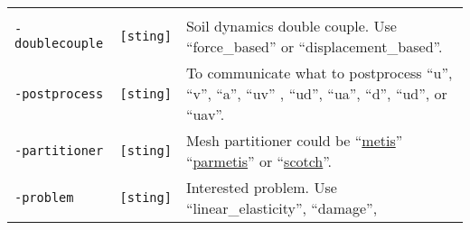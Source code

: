 \begin{longtable}[]{@{}lll@{}}
\begin{minipage}[t]{0.56\columnwidth}
\end{minipage}\tabularnewline
\begin{minipage}[t]{0.26\columnwidth}\raggedright\strut
\lstinline!-doublecouple!\strut
\end{minipage} & \begin{minipage}[t]{0.09\columnwidth}\raggedright\strut
\lstinline![sting]!\strut
\end{minipage} & \begin{minipage}[t]{0.56\columnwidth}\raggedright\strut
Soil dynamics double couple. Use ``force\_based'' or
``displacement\_based''.\strut
\end{minipage}\tabularnewline
\begin{minipage}[t]{0.26\columnwidth}\raggedright\strut
\lstinline!-postprocess!\strut
\end{minipage} & \begin{minipage}[t]{0.09\columnwidth}\raggedright\strut
\lstinline![sting]!\strut
\end{minipage} & \begin{minipage}[t]{0.56\columnwidth}\raggedright\strut
To communicate what to postprocess ``u'', ``v'', ``a'', ``uv'' , ``ud'',
``ua'', ``d'', ``ud'', or ``uav''.\strut
\end{minipage}\tabularnewline
\begin{minipage}[t]{0.26\columnwidth}\raggedright\strut
\lstinline!-partitioner!\strut
\end{minipage} & \begin{minipage}[t]{0.09\columnwidth}\raggedright\strut
\lstinline![sting]!\strut
\end{minipage} & \begin{minipage}[t]{0.56\columnwidth}\raggedright\strut
Mesh partitioner could be
``\href{http://glaros.dtc.umn.edu/gkhome/metis/metis/overview}{metis}''
``\href{http://glaros.dtc.umn.edu/gkhome/metis/parmetis/overview}{parmetis}''
or ``\href{http://www.labri.fr/perso/pelegrin/scotch/}{scotch}''.\strut
\end{minipage}\tabularnewline
\begin{minipage}[t]{0.26\columnwidth}\raggedright\strut
\lstinline!-problem!\strut
\end{minipage} & \begin{minipage}[t]{0.09\columnwidth}\raggedright\strut
\lstinline![sting]!\strut
\end{minipage} & \begin{minipage}[t]{0.56\columnwidth}\raggedright\strut
Interested problem. Use ``linear\_elasticity'', ``damage'',

\end{minipage}
\end{longtable}
